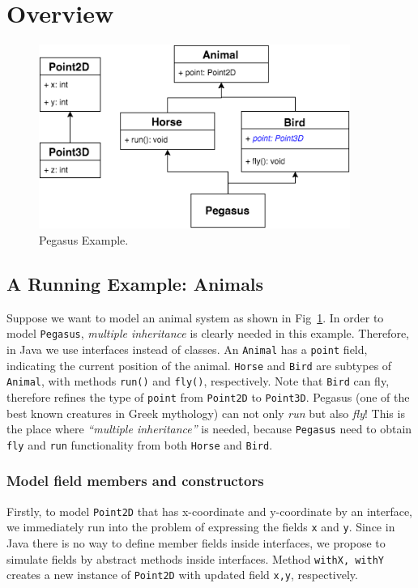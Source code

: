 \section{Overview}\label{sec:ep}

\begin{figure}[tbp]
\centering
\includegraphics[width=4in]{PegasusDetail.png}
\caption{Pegasus Example.}\label{fig:pegasus}
\end{figure}

\subsection{A Running Example: Animals}
Suppose we want to model an animal system as shown in Fig~\ref{fig:pegasus}. In
order to model \texttt{Pegasus}, \emph{multiple inheritance} is clearly needed
in this example. Therefore, in Java we use interfaces instead of classes. An
\texttt{Animal} has a \texttt{point} field, indicating the current position of
the animal. \texttt{Horse} and \texttt{Bird} are subtypes of \texttt{Animal},
with methods \texttt{run()} and \texttt{fly()}, respectively. Note that
\texttt{Bird} can fly, therefore refines the type of \texttt{point} from
\texttt{Point2D} to \texttt{Point3D}. Pegasus (one of the best known creatures
in Greek mythology) can not only \emph{run} but also \emph{fly}! This is the
place where \emph{``multiple inheritance''} is needed, because \texttt{Pegasus}
need to obtain \texttt{fly} and \texttt{run} functionality from both
\texttt{Horse} and \texttt{Bird}.

\subsubsection{Model field members and constructors}
Firstly, to model \texttt{Point2D} that has x-coordinate and y-coordinate by an
interface, we immediately run into the problem of expressing the fields
\texttt{x} and \texttt{y}. Since in Java there is no way to define member fields
inside interfaces, we propose to simulate fields by abstract methods inside
interfaces. Method \texttt{withX, withY} creates a new instance of
\texttt{Point2D} with updated field \texttt{x,y}, respectively.


